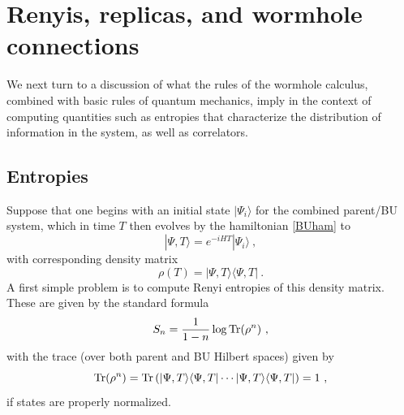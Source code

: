 \documentclass[12pt]{article}
\numberwithin{equation}{section}
\newcommand{\beq}{\begin{equation}}
\newcommand{\eeq}{\end{equation}}
\newcommand{\Tr}{{\rm Tr}}
\begin{document}
\section{Renyis, replicas, and wormhole connections}\label{sec:renyisrepwhc}

We next turn to a discussion of what the rules of the wormhole calculus, combined with basic rules of quantum mechanics, imply in the context of computing quantities such as entropies that characterize the distribution of information in the system, as well as correlators.

\subsection{Entropies}

Suppose that one begins with an initial state $|\Psi_i\rangle$ for the combined parent/BU system, which in time $T$ then evolves by the hamiltonian \eqref{BUham} to
\beq\label{Tstate}
|\Psi, T\rangle = e^{-i H T}|\Psi_i\rangle\ ,
\eeq
with corresponding density matrix
\beq\label{totdens}
\rho(T) = |\Psi, T\rangle \langle\Psi, T|\ .
\eeq
A first simple problem is to compute Renyi entropies of this density matrix.  These are given by the standard formula
\beq\label{Renyis}
S_n = \frac{1}{1-n}\log \Tr (\rho^n)\ , 
\eeq
with the trace (over both parent and BU Hilbert spaces) given by
\beq\label{trtr}
\Tr(\rho^n) = \Tr\left(|\Psi, T\rangle \langle\Psi, T| \cdots |\Psi, T\rangle \langle\Psi, T|\right) = 1\ ,
\eeq
if states are properly normalized.
\end{document}
